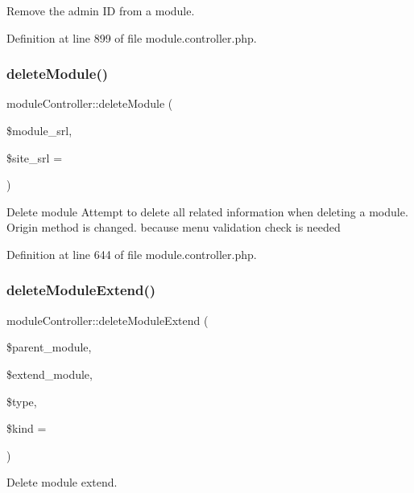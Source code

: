 Remove the admin ID from a module. 



Definition at line 899 of file module.\+controller.\+php.

\hypertarget{classmoduleController_add52eeb3f4a3cb900376af8007c09655}{}\label{classmoduleController_add52eeb3f4a3cb900376af8007c09655} 
\subsubsection{\texorpdfstring{delete\+Module()}{deleteModule()}}
{\footnotesize\ttfamily module\+Controller\+::delete\+Module (\begin{DoxyParamCaption}\item[{}]{\$module\+\_\+srl,  }\item[{}]{\$site\+\_\+srl = {} }\end{DoxyParamCaption})}

Delete module Attempt to delete all related information when deleting a module. Origin method is changed. because menu validation check is needed 

Definition at line 644 of file module.\+controller.\+php.

\hypertarget{classmoduleController_a74f94763f4e60fef8a0e4e4dabf777e0}{}\label{classmoduleController_a74f94763f4e60fef8a0e4e4dabf777e0} 
\subsubsection{\texorpdfstring{delete\+Module\+Extend()}{deleteModuleExtend()}}
{\footnotesize\ttfamily module\+Controller\+::delete\+Module\+Extend (\begin{DoxyParamCaption}\item[{}]{\$parent\+\_\+module,  }\item[{}]{\$extend\+\_\+module,  }\item[{}]{\$type,  }\item[{}]{\$kind = {\ttfamily \textquotesingle{}\textquotesingle{}} }\end{DoxyParamCaption})}



Delete module extend. 



